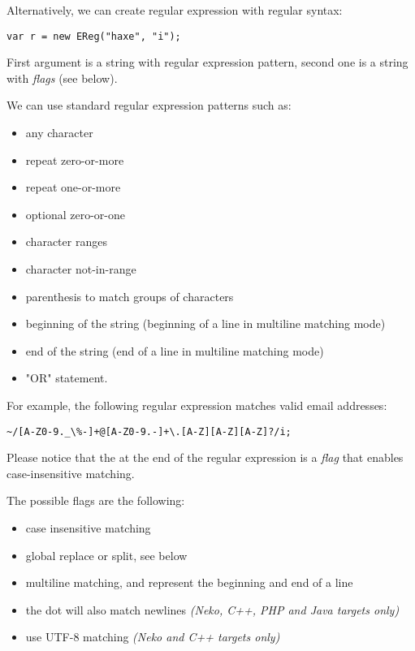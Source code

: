 Alternatively, we can create regular expression with regular syntax:

\begin{lstlisting}
var r = new EReg("haxe", "i");
\end{lstlisting}

First argument is a string with regular expression pattern, second one is a string with \emph{flags} (see below).

We can use standard regular expression patterns such as:
\begin{itemize}
	\item {} any character
	\item \expr{*} repeat zero-or-more
	\item \expr{+} repeat one-or-more
	\item {} optional zero-or-one
	\item \expr{[A-Z0-9]} character ranges
	\item {} character not-in-range
	\item {} parenthesis to match groups of characters
	\item \expr{\textasciicircum} beginning of the string (beginning of a line in multiline matching mode)
	\item \expr{\$} end of the string (end of a line in multiline matching mode)
	\item \expr{|} "OR" statement.
\end{itemize}

For example, the following regular expression matches valid email addresses:
\begin{lstlisting}
~/[A-Z0-9._\%-]+@[A-Z0-9.-]+\.[A-Z][A-Z][A-Z]?/i;
\end{lstlisting}

Please notice that the  at the end of the regular expression is a \emph{flag} that enables case-insensitive matching.

The possible flags are the following:
\begin{itemize}
	\item {} case insensitive matching
	\item {} global replace or split, see below
	\item {} multiline matching, \expr{\textasciicircum} and \expr{\$} represent the beginning and end of a line
	\item {} the dot  will also match newlines \emph{(Neko, C++, PHP and Java targets only)}
	\item {} use UTF-8 matching \emph{(Neko and C++ targets only)}
\end{itemize}

